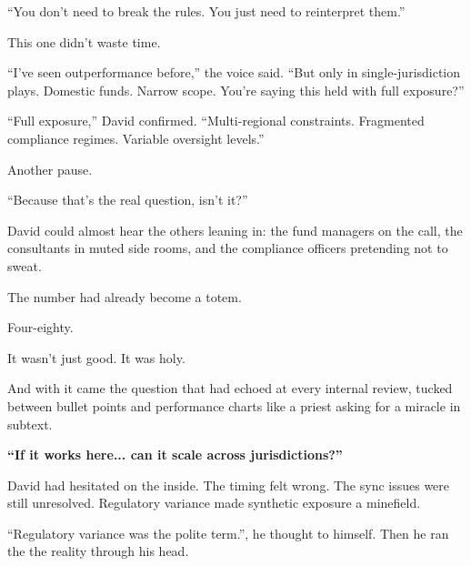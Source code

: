``You don’t need to break the rules. 
You just need to reinterpret them.''


This one didn’t waste time.

``I’ve seen outperformance before,'' the voice said. 
``But only in single-jurisdiction plays. 
Domestic funds. 
Narrow scope. 
You’re saying this held with full exposure?''

``Full exposure,'' David confirmed. 
``Multi-regional constraints. 
Fragmented compliance regimes. 
Variable oversight levels.''

Another pause.

``Because that’s the real question, isn’t it?''

David could almost hear the others leaning in:
the fund managers on the call, 
the consultants in muted side rooms, 
and the compliance officers pretending not to sweat.

The number had already become a totem.

Four-eighty.

It wasn’t just good. It was holy.

And with it came the question that had echoed at every internal review, 
tucked between bullet points and 
performance charts like a priest asking for a miracle in subtext.

\textbf{“If it works here... can it scale across jurisdictions?”}

David had hesitated on the inside.
The timing felt wrong. 
The sync issues were still unresolved. 
Regulatory variance made synthetic exposure a minefield.

``Regulatory variance was the polite term.'', he thought to himself. Then he ran the
the reality through his head.

\medskip


